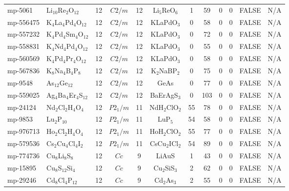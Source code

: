 {\begin{longtable}{llcccccccccc}
    mp-5061 & Li$_{10}$Re$_{2}$O$_{12}$ & 12    & $C2/m$ & 12    & Li$_{5}$ReO$_{6}$ & 1     & 59    & 0     & 0     & FALSE & N/A \\
    mp-556475 & K$_{4}$La$_{4}$Pd$_{4}$O$_{12}$ & 12    & $C2/m$ & 12    & KLaPdO$_{3}$ & 0     & 58    & 0     & 0     & FALSE & N/A \\
    mp-557232 & K$_{4}$Pd$_{4}$Sm$_{4}$O$_{12}$ & 12    & $C2/m$ & 12    & KLaPdO$_{3}$ & 0     & 72    & 0     & 0     & FALSE & N/A \\
    mp-558831 & K$_{4}$Nd$_{4}$Pd$_{4}$O$_{12}$ & 12    & $C2/m$ & 12    & KLaPdO$_{3}$ & 0     & 55    & 0     & 0     & FALSE & N/A \\
    mp-560569 & K$_{4}$Pd$_{4}$Pr$_{4}$O$_{12}$ & 12    & $C2/m$ & 12    & KLaPdO$_{3}$ & 0     & 58    & 0     & 0     & FALSE & N/A \\
    mp-567836 & K$_{8}$Na$_{4}$B$_{4}$P$_{8}$ & 12    & $C2/m$ & 12    & K$_{2}$NaBP$_{2}$ & 0     & 75    & 0     & 0     & FALSE & N/A \\
    mp-9548 & As$_{12}$Ge$_{12}$ & 12    & $C2/m$ & 12    & GeAs  & 0     & 77    & 0     & 0     & FALSE & N/A \\
    mp-559025 & Ag$_{4}$Ba$_{4}$Er$_{4}$S$_{12}$ & 12    & $C2/m$ & 12    & BaErAgS$_{3}$ & 0     & 103   & 0     & 0     & FALSE & N/A \\
    mp-24124 & Nd$_{2}$Cl$_{2}$H$_{4}$O$_{4}$ & 12    & $P2_1/m$ & 11    & NdH$_{2}$ClO$_{2}$ & 55    & 78    & 0     & 0     & FALSE & N/A \\
    mp-9853 & Lu$_{2}$P$_{10}$ & 12    & $P2_1/m$ & 11    & LuP$_{5}$ & 54    & 58    & 0     & 0     & FALSE & N/A \\
    mp-976713 & Ho$_{2}$Cl$_{2}$H$_{4}$O$_{4}$ & 12    & $P2_1/m$ & 11    & HoH$_{2}$ClO$_{2}$ & 55    & 77    & 0     & 0     & FALSE & N/A \\
    mp-579536 & Cs$_{2}$Cu$_{4}$Cl$_{4}$I$_{2}$ & 12    & $P2_1/m$ & 11    & CsCu$_{2}$ICl$_{2}$ & 54    & 89    & 0     & 0     & FALSE & N/A \\
    mp-774736 & Cu$_{8}$Li$_{8}$S$_{8}$ & 12    & $Cc$  & 9     & LiAuS & 1     & 43    & 0     & 0     & FALSE & N/A \\
    mp-15895 & Cu$_{8}$S$_{12}$Si$_{4}$ & 12    & $Cc$  & 9     & Cu$_{2}$SiS$_{3}$ & 2     & 62    & 0     & 0     & FALSE & N/A \\
    mp-29246 & Cd$_{8}$Cl$_{4}$P$_{12}$ & 12    & $Cc$  & 9     & Cd$_{2}$As$_{3}$ & 2     & 55    & 0     & 0     & FALSE & N/A \\

\end{longtable}}
